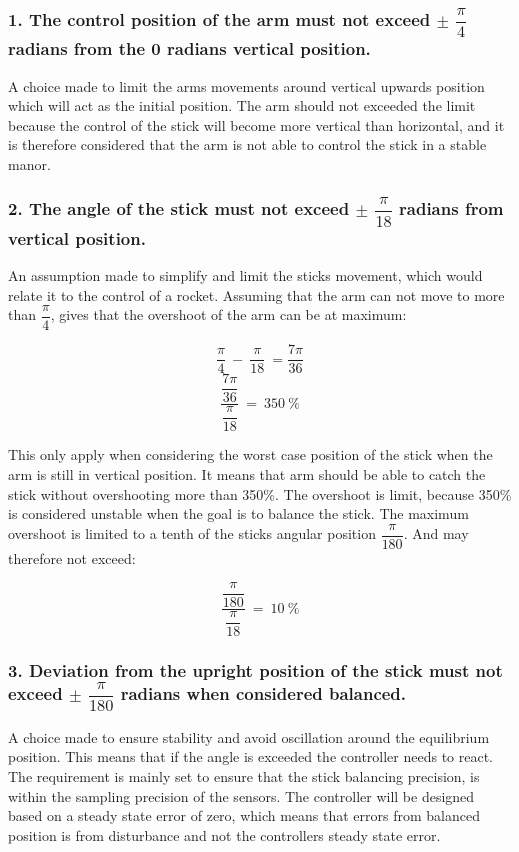 \subsubsection*{1. The control position of the arm must not exceed $\pm$ $\dfrac{\pi}{4}$ radians from the 0 radians vertical position.} 
\forceindent A choice made to limit the arms movements around vertical upwards position which will act as the initial position. The arm should not exceeded the limit because the control of the stick will become more vertical than horizontal, and it is therefore considered that the arm is not able to control the stick in a stable manor.  


\subsubsection*{2. The angle of the stick must not exceed $\pm$ $\dfrac{\pi}{18}$ radians from vertical position.}
\forceindent An assumption made to simplify and limit the sticks movement, which would relate it to the control of a rocket. Assuming that the arm can not move to more than $\dfrac{\pi}{4}$, gives that the overshoot of the arm can be at maximum:


\begin{equation}
\dfrac{\pi}{4}\ -\ \dfrac{\pi}{18}\ = \dfrac{7\pi}{36}
\end{equation}
\begin{equation}
\frac{\dfrac{7\pi}{36}}{\dfrac{\pi}{18}}\ =\ 350\ \% 
\end{equation}

This only apply when considering the worst case position of the stick when the arm is still in vertical position. It means that arm should be able to catch the stick without overshooting more than 350\%. The overshoot is limit, because 350\% is considered unstable when the goal is to balance the stick. The maximum overshoot is limited to a tenth of the sticks angular position $\dfrac{\pi}{180}$. And may therefore not exceed:

\begin{equation}
\frac{\dfrac{\pi}{180}}{\dfrac{\pi}{18}}\ =\ 10\ \% 
\end{equation}


\subsubsection*{3. Deviation from the upright position of the stick must not exceed $\pm$ $\dfrac{\pi}{180}$ radians when considered balanced.}
\forceindent A choice made to ensure stability and avoid oscillation around the equilibrium position.
This means that if the angle is exceeded the controller needs to react. The requirement is mainly set to ensure that the stick balancing precision, is within the sampling precision of the sensors. The controller will be designed based on a steady state error of zero, which means that errors from balanced position is from disturbance and not the controllers steady state error.

